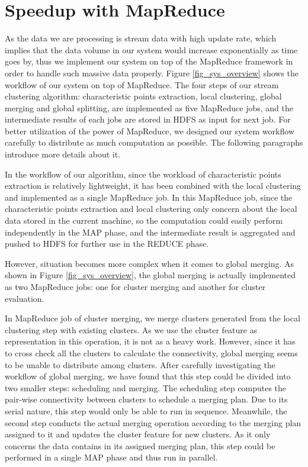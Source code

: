 \documentclass[conference]{IEEEtran}
\begin{document}
\section{Speedup with MapReduce}
As the data we are processing is stream data with high update rate, which implies that the data volume in our system would increase exponentially as time goes by, thus we implement our system on top of the MapReduce framework in order to handle such massive data properly. Figure \ref{fig_sys_overview} shows the workflow of our system on top of MapReduce. The four steps of our stream clustering algorithm: characteristic points extraction, local clustering, global merging and global splitting, are implemented as five MapReduce jobs, and the intermediate results of each jobs are stored in HDFS as input for next job. For better utilization of the power of MapReduce, we designed our system workflow carefully to distribute as much computation as possible. The following paragraphs introduce more details about it.


In the workflow of our algorithm, since the workload of characteristic points extraction is relatively lightweight, it has been combined with the local clustering and implemented as a single MapReduce job. In this MapReduce job, since the characteristic points extraction and local clustering only concern about the local data stored in the current machine, so the computation could easily perform independently in the MAP phase, and the intermediate result is aggregated and pushed to HDFS for further use in the REDUCE phase.


However, situation becomes more complex when it comes to global merging. As shown in Figure \ref{fig_sys_overview}, the global merging is actually implemented as two MapReduce jobs: one for cluster merging and another for cluster evaluation. 


In MapReduce job of cluster merging, we merge clusters generated from the local clustering step with existing clusters. As we use the cluster feature as representation in this operation, it is not as a heavy work. However, since it has to cross check all the clusters to calculate the connectivity, global merging seems to be unable to distribute among clusters. After carefully investigating the workflow of global merging, we have found that this step could be divided into two smaller steps: scheduling and merging. The scheduling step computes the pair-wise connectivity between clusters to schedule a merging plan. Due to its serial nature, this step would only be able to run in sequence. Meanwhile, the second step conducts the actual merging operation according to the merging plan assigned to it and updates the cluster feature for new clusters. As it only concerns the data contains in its assigned merging plan, this step could be performed in a single MAP phase and thus run in parallel.
\end{document}
